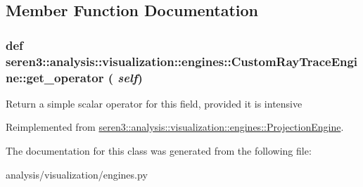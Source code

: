 \subsection{Member Function Documentation}
\hypertarget{classseren3_1_1analysis_1_1visualization_1_1engines_1_1CustomRayTraceEngine_ac72e1e31d092afc79e0e910f9b25022d}{
\subsubsection[{get\_\-operator}]{\setlength{\rightskip}{0pt plus 5cm}def seren3::analysis::visualization::engines::CustomRayTraceEngine::get\_\-operator ( {\em self})}}
\label{classseren3_1_1analysis_1_1visualization_1_1engines_1_1CustomRayTraceEngine_ac72e1e31d092afc79e0e910f9b25022d}
\begin{DoxyVerb}
Return a simple scalar operator for this field, provided it is intensive
\end{DoxyVerb}
 

Reimplemented from \hyperlink{classseren3_1_1analysis_1_1visualization_1_1engines_1_1ProjectionEngine_a42f12a0ccc166799a59549d9fe672f2b}{seren3::analysis::visualization::engines::ProjectionEngine}.

The documentation for this class was generated from the following file:\begin{DoxyCompactItemize}
\item 
analysis/visualization/engines.py\end{DoxyCompactItemize}
